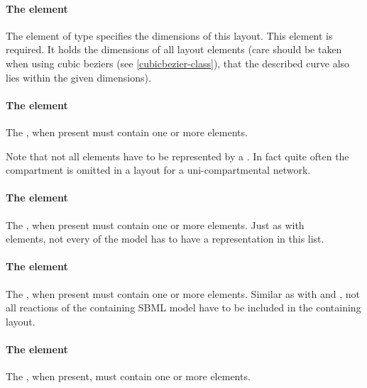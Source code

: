 \paragraph{The  element}
The  element of type \Dimensions specifies the 
dimensions of this layout. This element is required. It holds the 
dimensions of all layout elements (care should be taken when using cubic 
beziers (see \ref{cubicbezier-class}), that the described curve also lies 
within the given dimensions). 


\paragraph{The  element}
\label{listofcompartmentglyphs-class}
The , when present must contain one or 
more \CompartmentGlyph elements. 

Note that not all \Compartment elements have to be represented by a 
\CompartmentGlyph. In fact quite often the compartment is omitted 
in a layout for a uni-compartmental network. 


\paragraph{The  element}
\label{listofspeciesglyphs-class}
The , when present must contain 
one or more \SpeciesGlyph elements. Just as with \\ \CompartmentGlyph 
elements, not every \Species of the model has to have a representation 
in this list.


\paragraph{The  element}
\label{listofreactionglyphs-class}
The , when present must contain one or more 
\ReactionGlyph elements. Similar as with \ListOfCompartmentGlyphs and 
\ListOfSpeciesGlyphs, not all reactions of the containing SBML model 
have to be included in the containing layout. 


\paragraph{The  element}
\label{listoftextglyphs-class}
The , when present, must contain one or more 
\TextGlyph elements. 



